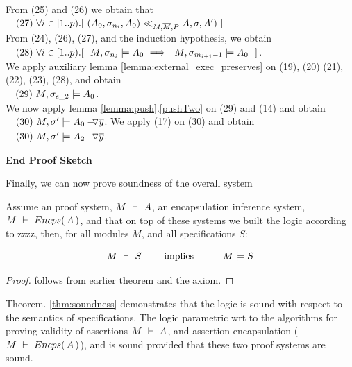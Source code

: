 \begin{description}
\\
From (25) and (26) we obtain that\\
$\ \strut \ \ (27)\   \forall i\in[1..p).[ \ ( A_0, \sigma_{n_{i}}, A_0 ) \ll_{M,\Mtwo,P}  A, \sigma, A' )\ ]$
\\
From (24), (26), (27), and the induction hypothesis, we obtain\\
$\ \strut \ \ (28)\    \forall i\in[1..p).[ \ \  M, \sigma_{n_{i}} \models A_0 \ \Longrightarrow \ \ M, \sigma_{m_{i+1}-1} \models A_0 \ \ ]$.\\
We apply auxiliary lemma \ref{lemma:external_exec_preserves} on (19), (20) (21), (22), (23), (28), and obtain\\
$\ \strut \ \ (29) \   M, \sigma_{e\_2} \models A_0$.\\
We now apply lemma \ref{lemma:push}.\ref{pushTwo} on (29) and  (14) and obtain\\
$\ \strut \ \ (30) \   M, \sigma'  \models \PushAS  {y}{A_0}$.
We apply (17) on (30) and obtain\\
$\ \strut \ \ (30) \   M, \sigma'  \models \PushAS  {y}{A_2}$.
\end{description}
\noindent
\vspace{.1cm}
  {\textbf{End Proof Sketch}} 

\vspace{1cm}

Finally, we can now prove soundness of the overall system

\begin{theorem}[Soundness]
\label{thm:soundness}
Assume an \SpecO proof system, $\proves{M}{A}$, 
an encapsulation inference system, $\proves{M}{\encaps{A}}$,
 and  that on top of these systems we built
 the \SpecLang logic according to zzzz,  then, for    all modules $M$, and all \SpecLang specifications  $S$:
 
 $$\proves{M}{S}\ \ \ \ \ \ \ \mbox{implies}\ \ \ \ \ \  \ \ \ \satisfies{M}{S}$$
\end{theorem}

\begin{proof}
follows from earlier theorem and the axiom.
\end{proof}
 


Theorem. \ref{thm:soundness} demonstrates 
 that the   \SpecLang logic is sound with respect to the semantics of \SpecLang specifications.
 The \SpecLang logic parametric wrt to the algorithms for proving validity of assertions
 $\proves{M}{A}$, and 
 assertion encapsulation ($\proves{M}{\encaps{A}}$), and is sound
 provided that these two proof systems are sound.

